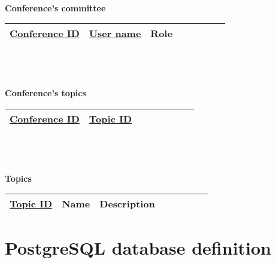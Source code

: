 \documentclass[12pt]{article}
\newcommand{\<}{\langle}
\renewcommand{\>}{\rangle}
\begin{document}
~\\
~\\
~\\
\textbf{Conference's committee}\\
\begin{tabular}{|c|c|c|c|c|c|c|c|}
\hline 
\underline{Conference ID} & \underline{User name} & Role\\ 
\hline 
\end{tabular}
~\\
~\\
~\\
\textbf{Conference's topics}\\
\begin{tabular}{|c|c|c|c|c|c|c|c|}
\hline 
\underline{Conference ID} & \underline{Topic ID}\\ 
\hline 
\end{tabular}
~\\
~\\
~\\
\textbf{Topics}\\
\begin{tabular}{|c|c|c|c|c|c|c|c|}
\hline 
\underline{Topic ID} & Name & Description\\ 
\hline 
\end{tabular}





\part{PostgreSQL database definition}
\end{document}

